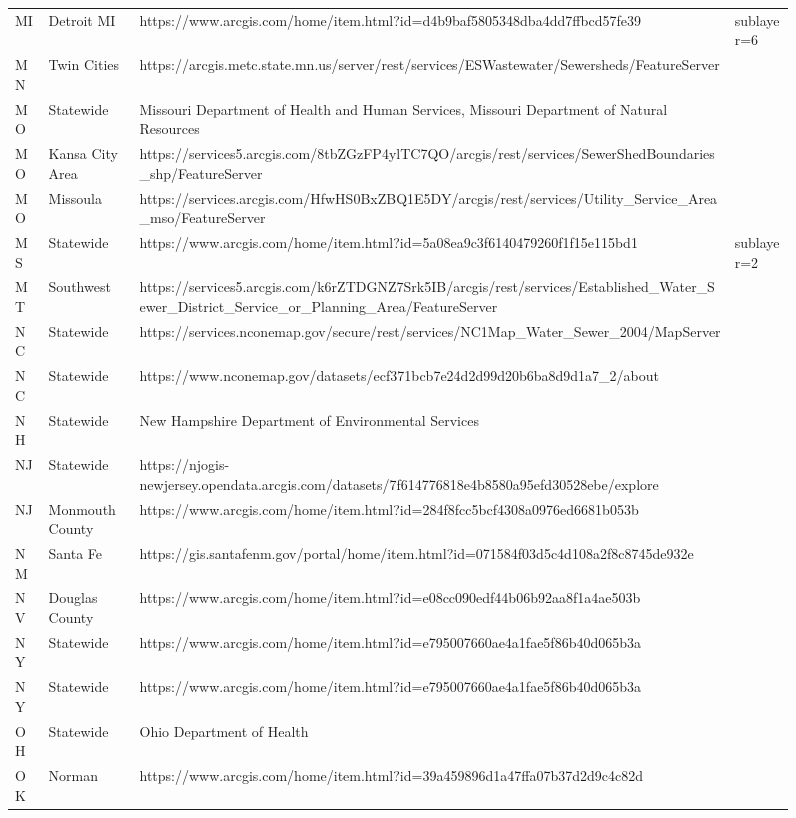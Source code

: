 \documentclass[
  letterpaper,
  DIV=11,
  numbers=noendperiod]{scrartcl}
\begin{document}
\begin{figure}
{\begin{table}
\begin{tabular*}{\linewidth}{@{\extracolsep{\fill}}lll}
MI & Detroit MI & https://www.arcgis.com/home/item.html?id=d4b9baf5805348dba4dd7ffbcd57fe39&sublayer=6 \\ 
MN & Twin Cities  & https://arcgis.metc.state.mn.us/server/rest/services/ESWastewater/Sewersheds/FeatureServer \\ 
MO & Statewide & Missouri Department of Health and Human Services, Missouri Department of Natural Resources \\ 
MO & Kansa City Area  & https://services5.arcgis.com/8tbZGzFP4ylTC7QO/arcgis/rest/services/SewerShedBoundaries_shp/FeatureServer \\ 
MO & Missoula  & https://services.arcgis.com/HfwHS0BxZBQ1E5DY/arcgis/rest/services/Utility_Service_Area_mso/FeatureServer \\ 
MS & Statewide & https://www.arcgis.com/home/item.html?id=5a08ea9c3f6140479260f1f15e115bd1&sublayer=2 \\ 
MT & Southwest & https://services5.arcgis.com/k6rZTDGNZ7Srk5IB/arcgis/rest/services/Established_Water_Sewer_District_Service_or_Planning_Area/FeatureServer \\ 
NC & Statewide & https://services.nconemap.gov/secure/rest/services/NC1Map_Water_Sewer_2004/MapServer \\ 
NC & Statewide & https://www.nconemap.gov/datasets/ecf371bcb7e24d2d99d20b6ba8d9d1a7_2/about \\ 
NH & Statewide & New Hampshire Department of Environmental Services \\ 
NJ & Statewide & https://njogis-newjersey.opendata.arcgis.com/datasets/7f614776818e4b8580a95efd30528ebe/explore \\ 
NJ & Monmouth County  & https://www.arcgis.com/home/item.html?id=284f8fcc5bcf4308a0976ed6681b053b \\ 
NM & Santa Fe  & https://gis.santafenm.gov/portal/home/item.html?id=071584f03d5c4d108a2f8c8745de932e \\ 
NV & Douglas County  & https://www.arcgis.com/home/item.html?id=e08cc090edf44b06b92aa8f1a4ae503b \\ 
NY & Statewide & https://www.arcgis.com/home/item.html?id=e795007660ae4a1fae5f86b40d065b3a \\ 
NY & Statewide & https://www.arcgis.com/home/item.html?id=e795007660ae4a1fae5f86b40d065b3a \\ 
OH & Statewide & Ohio Department of Health \\ 
OK & Norman  & https://www.arcgis.com/home/item.html?id=39a459896d1a47ffa07b37d2d9c4c82d \\ 

\end{tabular*}
\end{table}}
\end{figure}
\end{document}
